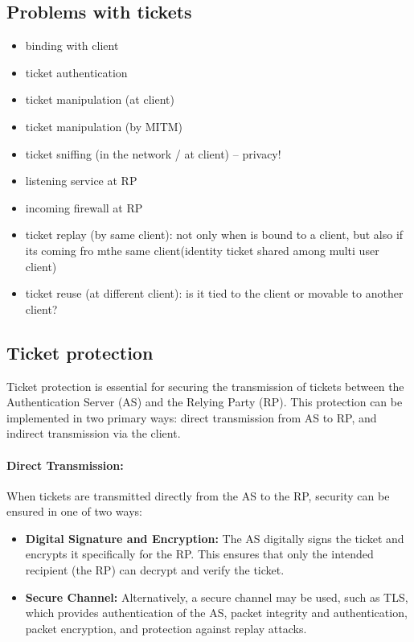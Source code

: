 \subsection{Problems with tickets}
\begin{itemize}
  \item binding with client
  \item ticket authentication
  \item ticket manipulation (at client)
  \item ticket manipulation (by MITM)
  \item ticket sniffing (in the network / at client) – privacy!
  \item listening service at RP
  \item incoming firewall at RP
  \item ticket replay (by same client): not only when is bound to a
    client, but also if its coming fro mthe same client(identity
    ticket shared among multi user client)
  \item ticket reuse (at different client): is it tied to the client
    or movable to another client?
\end{itemize}

\subsection{Ticket protection}

Ticket protection is essential for securing the transmission of
tickets between the Authentication Server (AS) and the Relying Party
(RP). This protection can be implemented in two primary ways: direct
transmission from AS to RP, and indirect transmission via the client.

\paragraph{Direct Transmission:} 
When tickets are transmitted directly from the AS to the RP, security
can be ensured in one of two ways:
\begin{itemize}
    \item \textbf{Digital Signature and Encryption:} The AS digitally
      signs the ticket and encrypts it specifically for the RP. This
      ensures that only the intended recipient (the RP) can decrypt
      and verify the ticket.
    \item \textbf{Secure Channel:} Alternatively, a secure channel may
      be used, such as TLS, which provides authentication of the AS,
      packet integrity and authentication, packet encryption, and
      protection against replay attacks.
\end{itemize}

